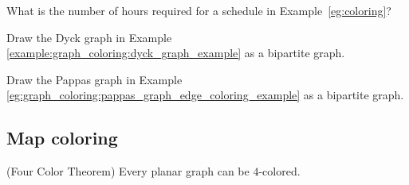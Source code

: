 \begin{problem}
\item
What is the number of hours required for a schedule
in Example~\ref{eg:coloring}?
\item
Draw the Dyck graph in Example \ref{example:graph_coloring:dyck_graph_example}
as a bipartite graph.

\item
Draw the Pappas graph in Example
\ref{eg:graph_coloring:pappas_graph_edge_coloring_example}
as a bipartite graph.
\end{problem}

\subsection{Map coloring}


\begin{theorem}
(Four Color Theorem)
Every planar graph can be $4$-colored.
\end{theorem}
